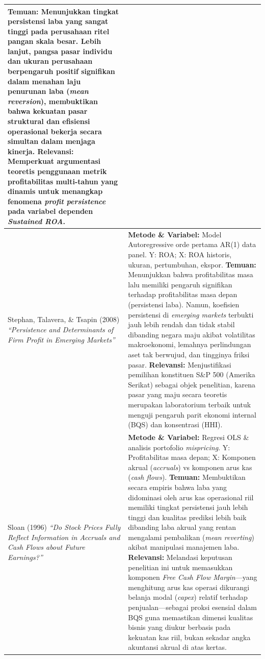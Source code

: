 \documentclass[12pt,a4paper]{article}
\begin{document}
\begin{longtable}{>{\raggedright\arraybackslash}p{} >{\raggedright\arraybackslash}p{}}
\textbf{Temuan:} Menunjukkan tingkat persistensi laba yang sangat tinggi pada perusahaan ritel pangan skala besar. Lebih lanjut, pangsa pasar individu dan ukuran perusahaan berpengaruh positif signifikan dalam menahan laju penurunan laba (\textit{mean reversion}), membuktikan bahwa kekuatan pasar struktural dan efisiensi operasional bekerja secara simultan dalam menjaga kinerja. \newline
\textbf{Relevansi:} Memperkuat argumentasi teoretis penggunaan metrik profitabilitas multi-tahun yang dinamis untuk menangkap fenomena \textit{profit persistence} pada variabel dependen \textit{Sustained ROA}. \\
\midrule
Stephan, Talavera, \& Tsapin (2008) \newline \textit{``Persistence and Determinants of Firm Profit in Emerging Markets''} &
\textbf{Metode \& Variabel:} Model Autoregressive orde pertama AR(1) data panel. Y: ROA; X: ROA historis, ukuran, pertumbuhan, ekspor. \newline
\textbf{Temuan:} Menunjukkan bahwa profitabilitas masa lalu memiliki pengaruh signifikan terhadap profitabilitas masa depan (persistensi laba). Namun, koefisien persistensi di \textit{emerging markets} terbukti jauh lebih rendah dan tidak stabil dibanding negara maju akibat volatilitas makroekonomi, lemahnya perlindungan aset tak berwujud, dan tingginya friksi pasar. \newline
\textbf{Relevansi:} Menjustifikasi pemilihan konstituen S\&P 500 (Amerika Serikat) sebagai objek penelitian, karena pasar yang maju secara teoretis merupakan laboratorium terbaik untuk menguji pengaruh parit ekonomi internal (BQS) dan konsentrasi (HHI). \\
\midrule
Sloan (1996) \newline \textit{``Do Stock Prices Fully Reflect Information in Accruals and Cash Flows about Future Earnings?''} &
\textbf{Metode \& Variabel:} Regresi OLS \& analisis portofolio \textit{mispricing}. Y: Profitabilitas masa depan; X: Komponen akrual (\textit{accruals}) vs komponen arus kas (\textit{cash flows}). \newline
\textbf{Temuan:} Membuktikan secara empiris bahwa laba yang didominasi oleh arus kas operasional riil memiliki tingkat persistensi jauh lebih tinggi dan kualitas prediksi lebih baik dibanding laba akrual yang rentan mengalami pembalikan (\textit{mean reverting}) akibat manipulasi manajemen laba. \newline
\textbf{Relevansi:} Melandasi keputusan penelitian ini untuk memasukkan komponen \textit{Free Cash Flow Margin}—yang menghitung arus kas operasi dikurangi belanja modal (\textit{capex}) relatif terhadap penjualan—sebagai proksi esensial dalam BQS guna memastikan dimensi kualitas bisnis yang diukur berbasis pada kekuatan kas riil, bukan sekadar angka akuntansi akrual di atas kertas. \\

\end{longtable}
\end{document}
